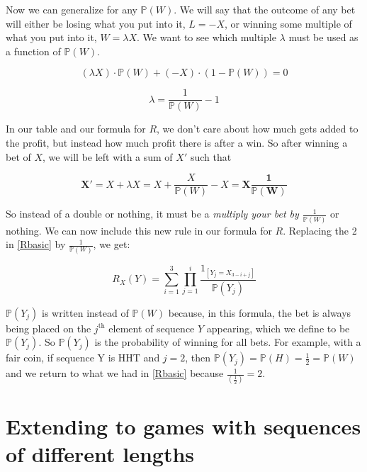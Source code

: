 \documentclass[english,12pt,a4paper,final]{article}
\begin{document}
Now we can generalize for any $\mathbb{P}(W)$. We will say that the outcome of any bet will either be losing what you put into it, $L=-X$, or winning some multiple of what you put into it, $W=\lambda X$. We want to see which multiple $\lambda$ must be used as a function of $\mathbb{P}(W)$.

\begin{equation*}
	(\lambda X) \cdot \mathbb{P}(W) + (-X) \cdot (1-\mathbb{P}(W)) = 0
\end{equation*}

\begin{equation*}
	\lambda = \frac{1}{\mathbb{P}(W)} - 1
\end{equation*}

In our table and our formula for $R$, we don't care about how much gets added to the profit, but instead how much profit there is after a win. So after winning a bet of $X$, we will be left with a sum of $X'$ such that

\begin{equation*}
	\mathbf{X'} = X + \lambda X = X + \frac{X}{\mathbb{P}(W)} - X = \mathbf{X\frac{1}{\mathbb{P}(W)}}
\end{equation*}

So instead of a double or nothing, it must be a \textit{multiply your bet by $\frac{1}{\mathbb{P}(W)}$} or nothing. We can now include this new rule in our formula for $R$. Replacing the 2 in \eqref{Rbasic} by $\frac{1}{\mathbb{P}(W)}$, we get:

\begin{equation}\label{RanyRandom}
	R_X(Y) = \sum_{i=1}^{3} \prod_{j=1}^{i} \frac{1_{[Y_j = X_{3-i+j}]}}{\mathbb{P}(Y_j)}
\end{equation}

$\mathbb{P}(Y_j)$ is written instead of $\mathbb{P}(W)$ because, in this formula, the bet is always being placed on the $j^{\text{th}}$ element of sequence $Y$ appearing, which we define to be $\mathbb{P}(Y_j)$. So $\mathbb{P}(Y_j)$ is the probability of winning for all bets. For example, with a fair coin, if sequence Y is HHT and $j=2$, then $\mathbb{P}(Y_j) = \mathbb{P}(H) = \frac{1}{2} = \mathbb{P}(W)$ and we return to what we had in \eqref{Rbasic} because $\frac{1}{(\frac{1}{2})} = 2$.

\section{Extending to games with sequences of different lengths}
\end{document}
